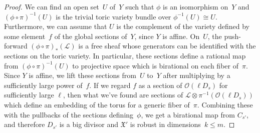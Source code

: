 \documentclass[11pt]{amsart}
\theoremstyle{definition}
\newcommand{\isom}{\cong}
\newcommand{\X}{\mathfrak X}
\begin{document}
\begin{proof}
We can find an open set~$U$ of~$Y$ such that $\phi$ is an isomorphism on~$Y$ and
$(\phi \circ \pi)^{-1}(U)$ is the trivial toric variety bundle over
$\phi^{-1}(U) \isom U$. Furthermore, we can assume that $U$ is the complement of
the variety defined by some element~$f$ of the global sections of~$Y$, since $Y$
is affine. On~$U$, the push-forward $(\phi \circ \pi)_*(\mathcal L)$ is a free
sheaf whose generators can be identified with the sections on the toric variety.
In particular, these sections define a rational map from $(\phi \circ
\pi)^{-1}(U)$ to projective space which is birational on each fiber of~$\pi$.
Since $Y$ is affine, we lift these sections from~$U$ to~$Y$ after multiplying by
a sufficiently large power of~$f$. If we regard $f$ as a section of $\mathcal
O(\ell D_s)$ for sufficiently large $\ell$, then what we've found are sections of
$\mathcal L \otimes \pi^{-1}(\mathcal O(\ell D_s))$ which define an embedding of
the torus for a generic fiber of~$\pi$. Combining these with the pullbacks of
the sections defining~$\phi$, we get a birational map from $C_{s'}$, and
therefore $D_{s'}$ is a big divisor and $\X'$ is robust in dimensions~$k \leq
m$.
\end{proof}
\end{document}
